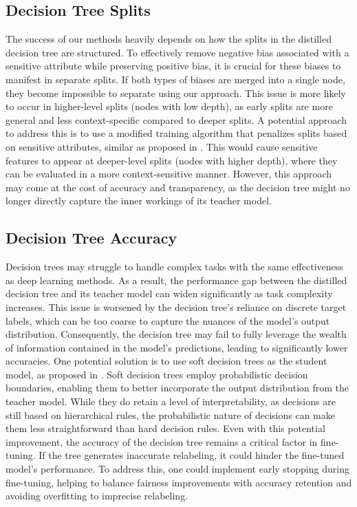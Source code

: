 \subsection*{Decision Tree Splits}
The success of our methods heavily depends on how the splits in the distilled decision tree are structured.  
To effectively remove negative bias associated with a sensitive attribute while preserving positive bias,  
it is crucial for these biases to manifest in separate splits.  
If both types of biases are merged into a single node, they become impossible to separate using our approach.  
This issue is more likely to occur in higher-level splits (nodes with low depth),  
as early splits are more general and less context-specific compared to deeper splits.  
A potential approach to address this is to use a modified training algorithm that penalizes splits based on sensitive attributes,  
similar as proposed in \cite{fairness_decision_tree}.  
This would cause sensitive features to appear at deeper-level splits (nodes with higher depth),
where they can be evaluated in a more context-sensitive manner. 
However, this approach may come at the cost of accuracy and transparency,  
as the decision tree might no longer directly capture the inner workings of its teacher model.

\subsection*{Decision Tree Accuracy}
Decision trees may struggle to handle complex tasks with the same effectiveness as deep learning methods.  
As a result, the performance gap between the distilled decision tree and its teacher model
can widen significantly as task complexity increases.
This issue is worsened by the decision tree's reliance on discrete target labels, 
which can be too coarse to capture the nuances of the model's output distribution.
Consequently, the decision tree may fail to fully leverage the wealth of information contained in the model's predictions,
leading to significantly lower accuracies.
One potential solution is to use soft decision trees as the student model, 
as proposed in \cite{soft_decision_tree}.
Soft decision trees employ probabilistic decision boundaries, 
enabling them to better incorporate the output distribution from the teacher model. 
While they do retain a level of interpretability, as decisions are still based on hierarchical rules,
the probabilistic nature of decisions can make them less straightforward than hard decision rules.
Even with this potential improvement, the accuracy of the decision tree remains a critical factor in fine-tuning.
If the tree generates inaccurate relabeling, it could hinder the fine-tuned model's performance.
To address this, one could implement early stopping during fine-tuning, 
helping to balance fairness improvements with accuracy retention and avoiding overfitting to imprecise relabeling.

